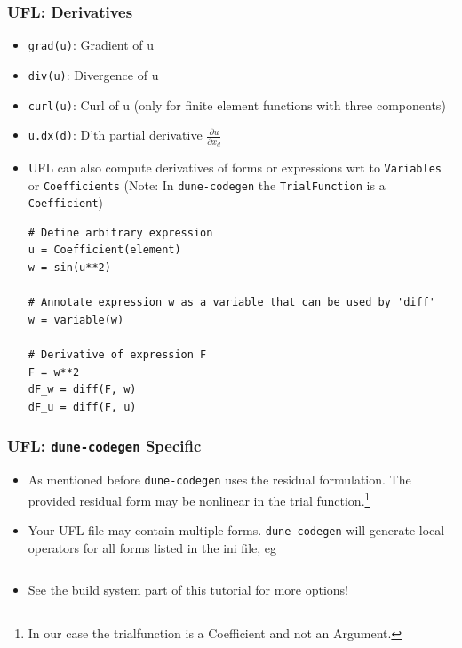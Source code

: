 \documentclass[aspectratio=169,11pt]{beamer}
\theoremstyle{definition}
\begin{document}
\begin{frame}[fragile]
  \frametitle{UFL: Derivatives}
  \begin{itemize}
  \item \lstinline{grad(u)}: Gradient of u
  \item \lstinline{div(u)}: Divergence of u
  \item \lstinline{curl(u)}: Curl of u (only for finite element functions with
    three components)
  \item \lstinline{u.dx(d)}: D'th partial derivative $\frac{\partial u}{\partial x_d}$
  \item UFL can also compute derivatives of forms or expressions wrt to
    \lstinline{Variables} or \lstinline{Coefficients} (Note: In
    \lstinline{dune-codegen} the \lstinline{TrialFunction} is a
    \lstinline{Coefficient})
    \begin{lstlisting}[language={}, basicstyle=\scriptsize, backgroundcolor=\color{listingbg}]
# Define arbitrary expression
u = Coefficient(element)
w = sin(u**2)

# Annotate expression w as a variable that can be used by 'diff'
w = variable(w)

# Derivative of expression F
F = w**2
dF_w = diff(F, w)
dF_u = diff(F, u)
    \end{lstlisting}
  \end{itemize}
\end{frame}

\begin{frame}[fragile]
  \frametitle{UFL: \lstinline{dune-codegen} Specific}
  \begin{itemize}
  \item As mentioned before \lstinline{dune-codegen} uses the residual
    formulation. The provided residual form may be nonlinear in the trial
    function.\footnote{In our case the trialfunction is a Coefficient and not
      an Argument.}
  \item Your UFL file may contain multiple forms. \lstinline{dune-codegen} will
    generate local operators for all forms listed in the ini file, eg
    \inputminted[fontsize=\small, firstline=12, lastline=13]{ini}{../src/heatequation.ini}

  \item See the build system part of this tutorial for more options!
  \end{itemize}
\end{frame}
\end{document}
